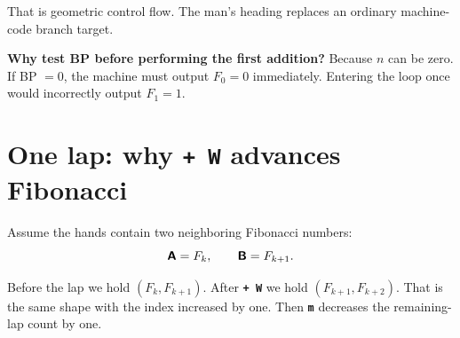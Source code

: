 \documentclass[11pt,a4paper]{article}
\newcommand{\op}[1]{\texttt{\bfseries #1}}
\newcommand{\reg}[1]{\textsf{\bfseries #1}}
\newcommand{\Fib}[1]{F_{#1}}
\begin{document}
That is geometric control flow. The man's heading replaces an ordinary
machine-code branch target.

\begin{warningbox}
  \textbf{Why test BP before performing the first addition?}
  Because \(n\) can be zero. If BP \(=0\), the machine must output
  \(\Fib0=0\) immediately. Entering the loop once would incorrectly output
  \(\Fib1=1\).
\end{warningbox}

\section{One lap: why \op{+ W} advances Fibonacci}

Assume the hands contain two neighboring Fibonacci numbers:
\[
  \reg{A}=\Fib{k},\qquad \reg{B}=\Fib{k+1}.
\]

\begin{center}
\end{center}

Before the lap we hold \((\Fib{k},\Fib{k+1})\). After \op{+ W} we hold
\((\Fib{k+1},\Fib{k+2})\). That is the same shape with the index increased by
one. Then \op{m} decreases the remaining-lap count by one.
\end{document}
